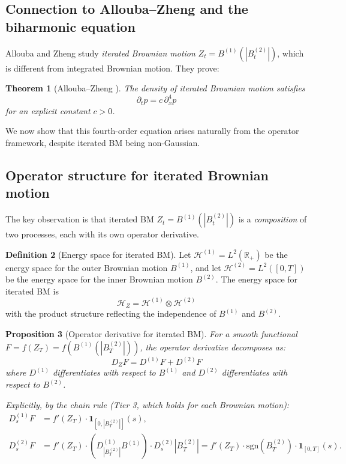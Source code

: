 \documentclass[11pt]{article}
\newtheorem{theorem}{Theorem}[section]
\newtheorem{proposition}[theorem]{Proposition}
\theoremstyle{definition}
\newtheorem{definition}[theorem]{Definition}
\newcommand{\R}{\mathbb{R}}
\newcommand{\Hi}{\mathcal{H}}
\begin{document}
\subsection{Connection to Allouba--Zheng and the biharmonic equation}

Allouba and Zheng \cite{AlloubaZheng2001} study \emph{iterated Brownian motion} $Z_t = B^{(1)}(|B^{(2)}_t|)$, which is different from integrated Brownian motion. They prove:

\begin{theorem}[Allouba--Zheng \cite{AlloubaZheng2001}]\label{thm:allouba-zheng}
The density of iterated Brownian motion satisfies
\begin{equation}
\partial_t p = c \, \partial_x^4 p
\end{equation}
for an explicit constant $c > 0$.
\end{theorem}

We now show that this fourth-order equation arises naturally from the operator framework, despite iterated BM being non-Gaussian.

\subsection{Operator structure for iterated Brownian motion}

The key observation is that iterated BM $Z_t = B^{(1)}(|B^{(2)}_t|)$ is a \emph{composition} of two processes, each with its own operator derivative.

\begin{definition}[Energy space for iterated BM]
Let $\Hi^{(1)} = L^2(\R_+)$ be the energy space for the outer Brownian motion $B^{(1)}$, and let $\Hi^{(2)} = L^2([0,T])$ be the energy space for the inner Brownian motion $B^{(2)}$. The energy space for iterated BM is
\begin{equation}
\Hi_Z = \Hi^{(1)} \otimes \Hi^{(2)}
\end{equation}
with the product structure reflecting the independence of $B^{(1)}$ and $B^{(2)}$.
\end{definition}

\begin{proposition}[Operator derivative for iterated BM]\label{prop:iterated-derivative}
For a smooth functional $F = f(Z_T) = f(B^{(1)}(|B^{(2)}_T|))$, the operator derivative decomposes as:
\begin{equation}
D_Z F = D^{(1)} F + D^{(2)} F
\end{equation}
where $D^{(1)}$ differentiates with respect to $B^{(1)}$ and $D^{(2)}$ differentiates with respect to $B^{(2)}$.

Explicitly, by the chain rule (Tier 3, which holds for each Brownian motion):
\begin{align}
D^{(1)}_s F &= f'(Z_T) \cdot \mathbf{1}_{[0, |B^{(2)}_T|]}(s), \\
D^{(2)}_s F &= f'(Z_T) \cdot (D^{(1)}_{|B^{(2)}_T|} B^{(1)}) \cdot D^{(2)}_s |B^{(2)}_T| = f'(Z_T) \cdot \mathrm{sgn}(B^{(2)}_T) \cdot \mathbf{1}_{[0,T]}(s).
\end{align}
\end{proposition}
\end{document}
